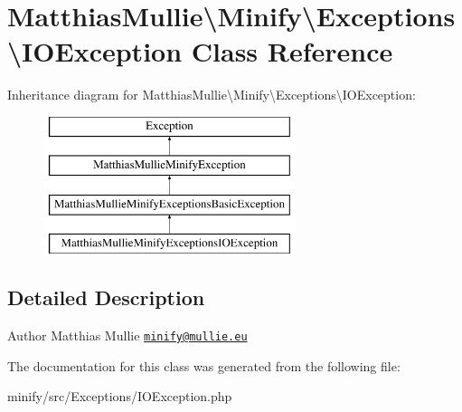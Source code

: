 \hypertarget{classMatthiasMullie_1_1Minify_1_1Exceptions_1_1IOException}{}\section{Matthias\+Mullie\textbackslash{}Minify\textbackslash{}Exceptions\textbackslash{}I\+O\+Exception Class Reference}
\label{classMatthiasMullie_1_1Minify_1_1Exceptions_1_1IOException}
Inheritance diagram for Matthias\+Mullie\textbackslash{}Minify\textbackslash{}Exceptions\textbackslash{}I\+O\+Exception\+:\begin{figure}[H]
\begin{center}
\leavevmode
\includegraphics[height=4.000000cm]{classMatthiasMullie_1_1Minify_1_1Exceptions_1_1IOException}
\end{center}
\end{figure}


\subsection{Detailed Description}
\begin{DoxyAuthor}{Author}
Matthias Mullie \href{mailto:minify@mullie.eu}{\tt minify@mullie.\+eu} 
\end{DoxyAuthor}


The documentation for this class was generated from the following file\+:\begin{DoxyCompactItemize}
\item 
minify/src/\+Exceptions/I\+O\+Exception.\+php\end{DoxyCompactItemize}

